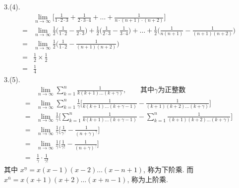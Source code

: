 3.(4).
\begin{align*}
	&\lim_{n\rightarrow\infty}\Big[\frac{1}{1\cdot2\cdot3}+\frac{1}{2\cdot3\cdot4} +\dots +\frac{1}{n\cdot(n+1)\cdot(n+2)} \Big]\\
	=&\lim_{n\rightarrow\infty}\frac{1}{2}\Big(\frac{1}{1\cdot2}-\frac{1}{2\cdot3}\Big)+\frac{1}{2}\Big(\frac{1}{2\cdot3}-\frac{1}{3\cdot4}\Big)+\dots+\frac{1}{2}\Big(\frac{1}{n(n+1)}-\frac{1}{(n+1)(n+2)}\Big)\\
	=&\lim_{n\rightarrow\infty}\frac{1}{2}\Big(\frac{1}{1\cdot2}-\frac{1}{(n+1)(n+2)}\Big)\\
	=&\frac{1}{2}\times\frac{1}{2}\\
	=&\frac{1}{4}
\end{align*}
3.(5).
\begin{align*}
	&\lim_{n\rightarrow\infty}\sum_{k=1}^{n}\frac{1}{k(k+1)\dots(k+\gamma)},
	\qquad \text{其中}\gamma\text{为正整数}\\
	=&\lim_{n\rightarrow\infty} \sum_{k=1}^n \frac{1}{\gamma} \Big[\frac{1}{k(k+1)\dots(k+\gamma-1)}-\frac{1}{(k+1)(k+2)\dots(k+\gamma)}\Big]\\
	=&\lim_{n\rightarrow\infty}\frac{1}{\gamma}
	\Big[\sum_{k=1}^n \frac{1}{k(k+1)\dots(k+\gamma-1)}-\sum_{k=1}^n \frac{1}{(k+1)(k+2)\dots(k+\gamma)}\Big]\\
	=&\lim_{n\rightarrow\infty} \frac{1}{\gamma}\Big[\frac{1}{\gamma^{\underline{\gamma}}}-\frac{1}{(n+\gamma)^{\underline{\gamma}}}\Big]\\
	=&\lim_{n\rightarrow\infty} \frac{1}{\gamma}\Big[\frac{1}{\gamma!}-\frac{1}{(n+\gamma)^{\underline{\gamma}}}\Big]\\
	=&\frac{1}{\gamma}\cdot\frac{1}{\gamma!}		
\end{align*}	
其中 $ x^{\underline{n}} = x(x-1)(x-2)\dots(x-n+1) $, 称为下阶乘. 而$ x^{\overline{n}} = x(x+1)(x+2)\dots(x+n-1) $, 称为上阶乘. 

